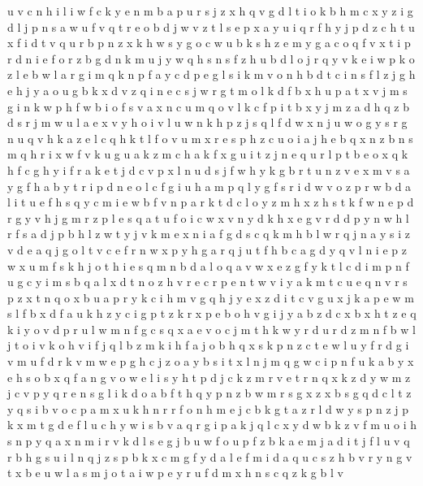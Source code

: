 \documentclass{article}
\begin{document}
u v c n h i
l i
w f c k y e n m b a p u r s j z x h q v g d l t i o
k b h m c x y z i g d l j p n s a w u f v q t r e
o b d j w v z t l s e p x a y u i q r f h
y j p d z c h t u x f
i d t v q u r b p n z x k h w s y g o c
w u b k s h z e m y g a c o q f v x t i p r d n
i e f o r z b g d n k m u j y w q h s
n s f z h u b d l o j r q y v k e i w p
k o z l
e b w l a r g i m q k n p
f a y c d p e g l s i k m v o n h
b d t c i n s f l z j g h e
h j y a o u g b k x d v z
q i n e c s j w r g t m o l k d f b x h u p a
t x v j m s g i n k w p h f
w b i o f s v a x n c u m q
o v l k c f p i t b x y j m z a d h q
z b d s r j m w u l a e x v y
h o i v l
u w n k h p z j s q l f d
w
x n j u w o g
y s r g n u q v h k a z e l c
q h k t l f o v u m x r e s
p h
z c u o i a j h e b q x n
z b n s m q h r i x w f v k u
g u a k z
m c h a k f x g u i t z j n e q
u r l p t b e o x q k h f c
g h y i f r a k e t j d c v p x l n u
d s j f w h y k g b r t u n z v e x
m v s a y g f
h a b y t r i
p d n e o l c f g i u
h a m p q l y g f s r i d w v
o z p r w b d a l i t u e f h s q y c m
i e w b f v n p a r k t d c l o y z m h x
z h s t k f w n e p d r g y v
h j g m r z p l e s q a t u f o i c w x v n y d k
h x e g v r d
d p y n w h l r
f s a d j
p b h l z w t y j v k m e x n i a f g d s c q
k m h b l w r q j n a y s i z v d e
a q j g o l t v c e f r n w x p y h
g a r q j u t f h b
c a g d y q v l n i e p z w x u m f s k h j o t
h i e s q m n b d a l
o q a v w x e z g f y k t l c d i m p n
f u g c y i m s b q a l x d t n o z h v r e
c r p e n t w v i
y
a k m t c u e q n v r s p z x
t n q o x b u a p r y k c i h m v g
q h j y e x z
d i t c v g u x j k a p e w m s l f b
x d f a u k h z y c i g p t
z k r x p e b o h v g i
j y a b z
d c x
b x h t z e q k i y o v d p r u l w m n f g c s
q x a e v o c j m t h k w y r d u
r d z m n f b w l j t o i v
k o h v i f j q l b z m
k i h f
a j o b h q x s k p n z c t e w l u y f r d g i v m
u f d r k v m w e p g h c j z o a y b s i t x l n
j m q g w c i p n f u k a b y x e h s o
b x q f a n g v o w e l i s y h t p d j c k z m r
v e t r n q x k z d
y
w m z j c v p y q r e n s g l i k d o a b f t h
q y p n z b w m r s g x
z x b s g q d c
l t z y q s i b v o c p a m x u k h n r
r
f o n h m e j c b k g t a z r l d w y s p
n z j p k x m t g d e f l u c h y w i s b v a q r
g i p a k
j q l c x y d w b k z v f m u o i h s n
p y q a x n m i r v k d l s e g j b u w f o
u p f z b k a e m j
a d i t j f l u v q r b h g s
u i l n q j z s p b k x c m g f y d a
l e f m i d a q u c s z h b v r y n
g v t x b e u w l a s m
j o t a i w p e y r u f d m x h n s c q z k g b l v
\end{document}
